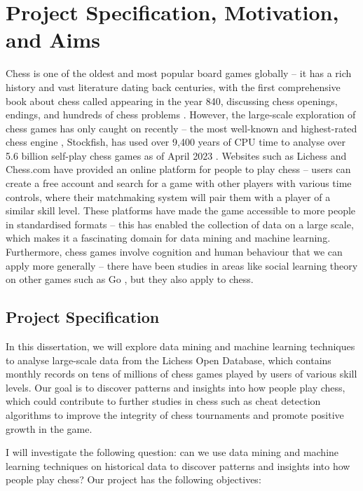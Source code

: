 \documentclass[a4paper, 11pt]{article}
\begin{document}
\section{Project Specification, Motivation, and Aims}
Chess is one of the oldest and most popular board games globally -- it has a rich history and vast literature dating back centuries, with the first comprehensive book about chess called  appearing in the year 840, discussing chess openings, endings, and hundreds of chess problems \cite{earliestChessBooks,wonning2014short}. However, the large-scale exploration of chess games has only caught on recently -- the most well-known and highest-rated chess engine \cite{computerChessRatingLists}, Stockfish, has used over 9,400 years of CPU time to analyse over 5.6 billion self-play chess games as of April 2023 \cite{stockfishTestingFramework}. Websites such as Lichess and Chess.com have provided an online platform for people to play chess -- users can create a free account and search for a game with other players with various time controls, where their matchmaking system will pair them with a player of a similar skill level. These platforms have made the game accessible to more people in standardised formats -- this has enabled the collection of data on a large scale, which makes it a fascinating domain for data mining and machine learning. Furthermore, chess games involve cognition and human behaviour that we can apply more generally -- there have been studies in areas like social learning theory on other games such as Go \cite{beheim2014strategic}, but they also apply to chess.

\subsection{Project Specification}
In this dissertation, we will explore data mining and machine learning techniques to analyse large-scale data from the Lichess Open Database, which contains monthly records on tens of millions of chess games played by users of various skill levels. Our goal is to discover patterns and insights into how people play chess, which could contribute to further studies in chess such as cheat detection algorithms to improve the integrity of chess tournaments and promote positive growth in the game.

I will investigate the following question: can we use data mining and machine learning techniques on historical data to discover patterns and insights into how people play chess? Our project has the following objectives:
\end{document}
